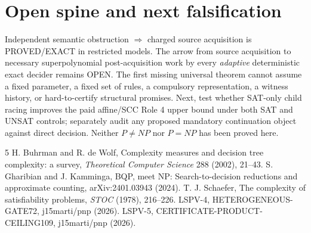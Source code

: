 \documentclass[11pt]{article}
\begin{document}
\section{Open spine and next falsification}
Independent semantic obstruction $\Rightarrow$ charged source acquisition is PROVED/EXACT in restricted models. The arrow from source acquisition to necessary superpolynomial post-acquisition work by every \emph{adaptive} deterministic exact decider remains OPEN. The first missing universal theorem cannot assume a fixed parameter, a fixed set of rules, a compulsory representation, a witness history, or hard-to-certify structural promises. Next, test whether SAT-only child racing improves the paid affine/SCC Role 4 upper bound under both SAT and UNSAT controls; separately audit any proposed mandatory continuation object against direct decision. Neither $P\ne NP$ nor $P=NP$ has been proved here.
\begin{thebibliography}{5}
 H. Buhrman and R. de Wolf, Complexity measures and decision tree complexity: a survey, \emph{Theoretical Computer Science} 288 (2002), 21--43.
 S. Gharibian and J. Kamminga, BQP, meet NP: Search-to-decision reductions and approximate counting, arXiv:2401.03943 (2024).
 T. J. Schaefer, The complexity of satisfiability problems, \emph{STOC} (1978), 216--226.
 LSPV-4, HETEROGENEOUS-GATE72, j15marti/pnp (2026).
 LSPV-5, CERTIFICATE-PRODUCT-CEILING109, j15marti/pnp (2026).
\end{thebibliography}
\end{document}
